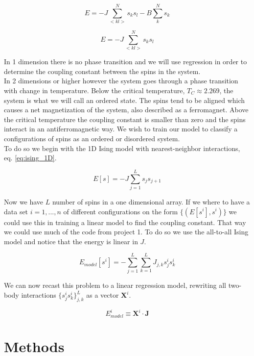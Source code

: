 \documentclass[a4paper,12pt, english]{article}
\begin{document}
\begin{equation} \label{eq:Ising}
E = -J \sum_{<kl>}^N s_k s_l - B \sum_k^N s_k
\end{equation}

\begin{equation} \label{eq:Ising_model}
E = -J \sum_{<kl>}^N s_k s_l
\end{equation}

In 1 dimension there is no phase transition and we will use regression in order to determine the coupling constant between the spins in the system.  \\
In 2 dimensions or higher however the system goes through a phase transition with change in temperature. Below the critical temperature, $T_C \approx 2.269$, the system is what we will call an ordered state. The spins tend to be aligned which causes a net magnetization of the system, also described as a ferromagnet. Above the critical temperature the coupling constant is smaller than zero and the spins interact in an antiferromagnetic way. We wish to train our model to classify a configurations of spins as an ordered or disordered system. \\
To do so we begin with the 1D Ising model with nearest-neighbor interactions, eq. \ref{eq:ising_1D}. 

\begin{equation} \label{eq:ising_1D}
E[s] = -J \sum_{j=1}^L s_j s_{j+1}
\end{equation}

Now we have $L$ number of spins in a one dimensional array. If we where to have a data set $i = 1, ..., n$ of different configurations on the form $\{(E[s^i], s^i)\}$ we could use this in training a linear model to find the coupling constant. That way we could use much of the code from project 1. To do so we use the all-to-all Ising model and notice that the energy is linear in $J$.  

\begin{equation}
E_{model}[s^i] = -\sum_{j=1}^L \sum_{k=1}^L J_{j,k} s_j^i s_k^i
\end{equation}

We can now recast this problem to a linear regression model, rewriting all two-body interactions $\{s_j^i s_k^i\}_{j,k}^L$ as a vector $\mathbf{X}^i$. 

\begin{equation}
E_{model}^i \equiv \mathbf{X}^i \cdot \mathbf{J}
\end{equation}

\section{Methods}
\end{document}
